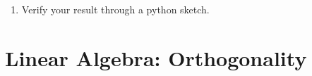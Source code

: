 \documentclass[journal,12pt,twocolumn]{IEEEtran}
\renewcommand\thesection{\arabic{section}}
\begin{document}
\begin{enumerate}[label=\thesection.\arabic*
,ref=\thesection.\theenumi]
\begin{align}
z = \sqrt{1-x^2},
dz &= -\frac{x}{\sqrt{1-x^2}}\, dx
\nonumber \\
\implies \int\frac{\sqrt{1-x^2}}{ x}\,dx &= -\int\frac{z^2}{ 1-z^2}\,dz
\nonumber \\
 &= \int\,dz-\int\frac{1}{ 1-z^2}\,dz
\nonumber \\
 &= z + \frac{1}{2}\ln \frac{1-z}{1+z} + C
\end{align}
Thus, 
\begin{align}
y = \pm \brak{\sqrt{1-x^2} + \frac{1}{2}\ln \frac{1-\sqrt{1-x^2}}{1+\sqrt{1-x^2}}} 
\end{align}
since $C=0$ after substituting $x=0, y = 1$.
\item Verify your result through a python sketch.
\end{enumerate}

\section{Linear Algebra: Orthogonality}
\end{document}

